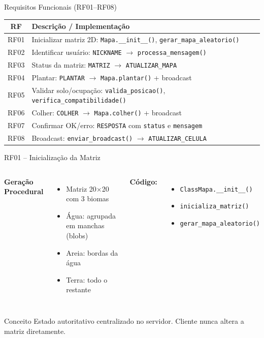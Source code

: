 \documentclass[aspectratio=169]{beamer}
\begin{document}
\begin{frame}{Requisitos Funcionais (RF01--RF08)}
  \footnotesize
  \begin{tabularx}{\textwidth}{c>{\raggedright\arraybackslash}X}
    \toprule
    \textbf{RF} & \textbf{Descri\c{c}\~ao / Implementa\c{c}\~ao} \\
    \midrule
    RF01 & Inicializar matriz 2D: \texttt{Mapa.\_\_init\_\_()}, \texttt{gerar\_mapa\_aleatorio()} \\
    RF02 & Identificar usu\'ario: \texttt{NICKNAME} $\rightarrow$ \texttt{processa\_mensagem()} \\
    RF03 & Status da matriz: \texttt{MATRIZ} $\rightarrow$ \texttt{ATUALIZAR\_MAPA} \\
    RF04 & Plantar: \texttt{PLANTAR} $\rightarrow$ \texttt{Mapa.plantar()} + broadcast \\
    RF05 & Validar solo/ocupa\c{c}\~ao: \texttt{valida\_posicao()}, \texttt{verifica\_compatibilidade()} \\
    RF06 & Colher: \texttt{COLHER} $\rightarrow$ \texttt{Mapa.colher()} + broadcast \\
    RF07 & Confirmar OK/erro: \texttt{RESPOSTA} com \texttt{status} e \texttt{mensagem} \\
    RF08 & Broadcast: \texttt{enviar\_broadcast()} $\rightarrow$ \texttt{ATUALIZAR\_CELULA} \\
    \bottomrule
  \end{tabularx}
\end{frame}

\begin{frame}{RF01 -- Inicializa\c{c}\~ao da Matriz}
  \begin{columns}
    \textbf{Gera\c{c}\~ao Procedural}
    \begin{itemize}
      \item Matriz 20$\times$20 com 3 biomas
      \item \'Agua: agrupada em manchas (blobs)
      \item Areia: bordas da \'agua
      \item Terra: todo o restante
    \end{itemize}
    \textbf{C\'odigo:}
    \begin{itemize}
      \item \texttt{ClassMapa.\_\_init\_\_()}
      \item \texttt{inicializa\_matriz()}
      \item \texttt{gerar\_mapa\_aleatorio()}
    \end{itemize}
  \end{columns}
  \vfill
  \begin{exampleblock}{Conceito}
    Estado autoritativo centralizado no servidor. Cliente nunca altera a matriz diretamente.
  \end{exampleblock}
\end{frame}
\end{document}
